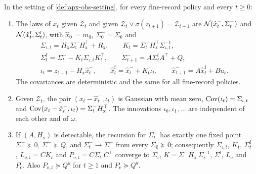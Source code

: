 \begin{lemma}\label{lem:apx-obs-separation}
In the setting of \cref{def:apx-obs-setting}, for every fine-record policy and every $t\ge0$:
\begin{enumerate}
\item[(a)] The laws of $x_t$ given $\mathcal Z_t$ and given $\mathcal Z_t\vee\sigma(z_{t+1})=\mathcal Z_{t+1}$ are $\mathcal{N}(\hat x^-_t,\Sigma^-_t)$ and $\mathcal{N}(\hat x^{\mathrm f}_t,\Sigma^{\mathrm f}_t)$, with $\hat x^-_0=m_0$, $\Sigma^-_0=\Sigma_0$ and
\begin{equation}\label{eq:apx-obs-fine-filter}
\begin{gathered}
\Sigma_{\iota,t}=H_{\mathrm x}\Sigma^-_tH_{\mathrm x}^\top+R_{\mathrm x},\qquad K_t=\Sigma^-_tH_{\mathrm x}^\top\Sigma_{\iota,t}^{-1},\\
\Sigma^{\mathrm f}_t=\Sigma^-_t-K_t\Sigma_{\iota,t}K_t^\top,\qquad\Sigma^-_{t+1}=A\Sigma^{\mathrm f}_tA^\top+Q,\\
\iota_t=z_{t+1}-H_{\mathrm x}\hat x^-_t,\qquad\hat x^{\mathrm f}_t=\hat x^-_t+K_t\iota_t,\qquad\hat x^-_{t+1}=A\hat x^{\mathrm f}_t+Bu_t .
\end{gathered}
\end{equation}
The covariances are deterministic and the same for all fine-record policies.
\item[(b)] Given $\mathcal Z_t$, the pair $(x_t-\hat x^-_t,\iota_t)$ is Gaussian with mean zero, $\operatorname{Cov}(\iota_t)=\Sigma_{\iota,t}$ and $\operatorname{Cov}(x_t-\hat x^-_t,\iota_t)=\Sigma^-_tH_{\mathrm x}^\top$. The innovations $\iota_0,\iota_1,\dots$ are independent of each other and of $\omega$.
\item[(c)] If $(A,H_{\mathrm x})$ is detectable, the recursion for $\Sigma^-_t$ has exactly one fixed point $\Sigma^-\succeq0$, $\Sigma^-\succeq Q$, and $\Sigma^-_t\to\Sigma^-$ from every $\Sigma_0\succeq0$; consequently $\Sigma_{\iota,t}$, $K_t$, $\Sigma^{\mathrm f}_t$, $L_{\mathrm e,t}=CK_t$ and $P_{\mathrm e,t}=C\Sigma^-_tC^\top$ converge to $\Sigma_\iota$, $K=\Sigma^-H_{\mathrm x}^\top\Sigma_\iota^{-1}$, $\Sigma^{\mathrm f}$, $L_{\mathrm e}$ and $P_{\mathrm e}$. Also $P_{\mathrm e,t}\succeq Q^y$ for $t\ge1$ and $P_{\mathrm e}\succeq Q^y$.
\end{enumerate}
\end{lemma}

